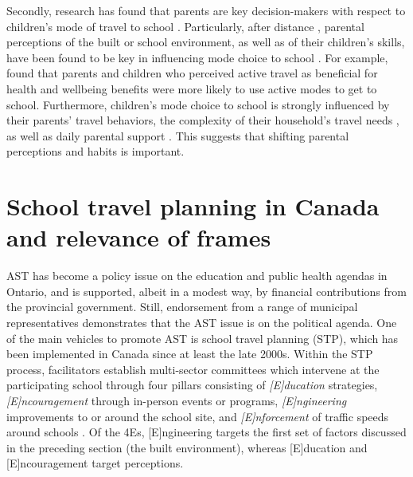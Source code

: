 \documentclass[preprint, 3p,
authoryear]{elsarticle} %
\begin{document}
Secondly, research has found that parents are key decision-makers with
respect to children's mode of travel to school
\citep{rothmanAssociationsParentsPerception2015}. Particularly, after
distance \citep{curtis2015built}, parental perceptions of the built or
school environment, as well as of their children's skills, have been
found to be key in influencing mode choice to school
\citep{demeesterParentalPerceivedNeighborhood2014, panterAttitudesSocialSupport2010, mandic2020differences, mammenUnderstandingDriveEscort2012, faulknerWhatQuickestEasiest2010}.
For example, \citet{ramanathanHappinessMotionEmotions2014a} found that
parents and children who perceived active travel as beneficial for
health and wellbeing benefits were more likely to use active modes to
get to school. Furthermore, children's mode choice to school is strongly
influenced by their parents' travel behaviors, the complexity of their
household's travel needs \citep{buliungLivingJourneySchool2021}, as well
as daily parental support \citep{mahDoesParentalSupport2017a}. This
suggests that shifting parental perceptions and habits is important.

\hypertarget{stp-frames}{%
\section{School travel planning in Canada and relevance of
frames}\label{stp-frames}}

AST has become a policy issue on the education and public health agendas
in Ontario, and is supported, albeit in a modest way, by financial
contributions from the provincial government. Still, endorsement from a
range of municipal representatives
\citep[see][]{buttazzoniSupportingActiveSchool2018, mammenPuttingSchoolTravel2015}
demonstrates that the AST issue is on the political agenda. One of the
main vehicles to promote AST is school travel planning (STP), which has
been implemented in Canada since at least the late 2000s. Within the STP
process, facilitators establish multi-sector committees which intervene
at the participating school through four pillars consisting of
\emph{{[}E{]}ducation} strategies, \emph{{[}E{]}ncouragement} through
in-person events or programs, \emph{{[}E{]}ngineering} improvements to
or around the school site, and \emph{{[}E{]}nforcement} of traffic
speeds around schools \citep[or
4Es,][]{langUnderstandingModalChoice2011, mammenActiveSchoolTravel2014}.
Of the 4Es, {[}E{]}ngineering targets the first set of factors discussed
in the preceding section (the built environment), whereas
{[}E{]}ducation and {[}E{]}ncouragement target perceptions.
\end{document}
